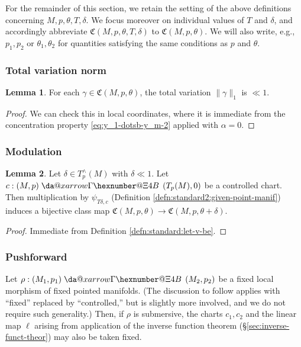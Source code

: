 \documentclass[reqno]{amsart}
\makeatletter
\newcommand*{\da@rightarrow}{\mathchar"0\hexnumber@\symAMSa 4B }
\newcommand*{\xdashrightarrow}[2][]{%
  \mathrel{%
    \mathpalette{\da@xarrow{#1}{#2}{}\da@rightarrow{\,}{}}{}%
  }%
}
\newcommand*{\da@xarrow}[7]{%
  \sbox0{$\ifx#7\scriptstyle\scriptscriptstyle\else\scriptstyle\fi#5#1#6\m@th$}%
  \sbox2{$\ifx#7\scriptstyle\scriptscriptstyle\else\scriptstyle\fi#5#2#6\m@th$}%
  \sbox4{$#7\dabar@\m@th$}%
  \dimen@=\wd0 %
  \ifdim\wd2 >\dimen@
    \dimen@=\wd2 %
  \fi
  \count@=2 %
  \def\da@bars{\dabar@\dabar@}%
  \@whiledim\count@\wd4<\dimen@\do{%
    \advance\count@\@ne
    \expandafter\def\expandafter\da@bars\expandafter{%
      \da@bars
      \dabar@ 
    }%
  }%
  \mathrel{#3}%
  \mathrel{%
    \mathop{\da@bars}\limits
    \ifx\\#1\\%
    \else
      _{\copy0}%
    \fi
    \ifx\\#2\\%
    \else
      ^{\copy2}%
    \fi
  }%
  \mathrel{#4}%
}
\DeclareMathOperator{\U}{U}
\theoremstyle{plain} \newtheorem{theorem} {Theorem}
\theoremstyle{definition} \newtheorem{definition} [theorem] {Definition}
\theoremstyle{itplain} %
\newtheorem{lemma}[theorem]{Lemma}
\numberwithin{equation}{section}
\numberwithin{theorem}{section}
\makeatother
\begin{document}
For the remainder of this section, we retain the setting of the above definitions concerning $M, p, \theta, T, \delta$.  We focus moreover on individual values of $T$ and $\delta$, and accordingly abbreviate $\mathfrak{C}(M,p,\theta,T,\delta)$ to $\mathfrak{C}(M,p,\theta)$.  We will also write, e.g., $p_1, p_2$ or $\theta_1, \theta_2$ for quantities satisfying the same conditions as $p$ and $\theta$.


\subsubsection{Total variation norm}

\begin{lemma}\label{lem:standard:each-gamma-in} 
  For each $\gamma \in \mathfrak{C}(M,p,\theta)$, the total variation $\|\gamma \|_1$ is $\ll 1$. 
\end{lemma}
\begin{proof}
  We can check this in local coordinates, where it is immediate from the concentration property \eqref{eq:y_1-dotsb-y_m-2} applied with $\alpha =0$. 
\end{proof}


\subsubsection{Modulation}\label{sec:modulation}

\begin{lemma}\label{lem:modulation}
  Let $\delta \in T_p^\wedge(M)$ with $\delta \ll 1$.  Let $c : (M,p) \xdashrightarrow{} (T_p(M), 0)$ be a controlled chart.  Then multiplication by $\psi_{T \delta,c}$ (Definition \ref{defn:standard2:given-point-manif}) induces a bijective class map $\mathfrak{C}(M,p,\theta) \rightarrow \mathfrak{C}(M,p,\theta+\delta)$.
\end{lemma}
\begin{proof}
  Immediate from Definition \ref{defn:standard:let-v-be}.
\end{proof}


\subsubsection{Pushforward}
Let $\rho : (M_1, p_1) \xdashrightarrow{} (M_2, p_2)$ be a fixed local morphism of fixed pointed manifolds.  (The discussion to follow applies with ``fixed'' replaced by ``controlled,'' but is slightly more involved, and we do not require such generality.)  Then, if $\rho$ is submersive, the charts $c_1, c_2$ and the linear map $\ell$ arising from application of the inverse function theorem (\S\ref{sec:inverse-funct-theor}) may also be taken fixed.
\end{document}
